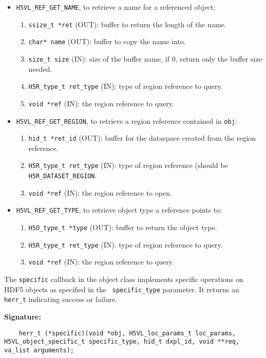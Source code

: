 \begin{itemize}
\item {\tt H5VL\_REF\_GET\_NAME}, to retrieve a name for a referenced object:
  \begin{enumerate}
  \item {\tt ssize\_t *ret} (OUT): buffer to return the length of the
    name.
  \item {\tt char* name} (OUT): buffer to copy the name into.
  \item {\tt size\_t size} (IN): size of the buffer name, if 0, return
    only the buffer size needed.
  \item {\tt H5R\_type\_t ret\_type} (IN): type of region reference to
    query.
  \item {\tt void *ref} (IN): the region reference to query.
  \end{enumerate}
  
\item {\tt H5VL\_REF\_GET\_REGION}, to retrieve a region reference
  contained in {\tt obj}:
  \begin{enumerate}
  \item {\tt hid\_t *ret\_id} (OUT): buffer for the dataspace created
    from the region reference.
  \item {\tt H5R\_type\_t ret\_type} (IN): type of region reference
    (should be {\tt H5R\_DATASET\_REGION}.
  \item {\tt void *ref} (IN): the region reference to open.
  \end{enumerate}

\item {\tt H5VL\_REF\_GET\_TYPE}, to retrieve object type a reference
  points to:
  \begin{enumerate}
  \item {\tt H5O\_type\_t *type} (OUT): buffer to return the object type.
  \item {\tt H5R\_type\_t ret\_type} (IN): type of region reference to
    query.
  \item {\tt void *ref} (IN): the region reference to query.
  \end{enumerate}
\end{itemize}

The {\tt specific} callback in the object class implements specific operations on HDF5 objects as specified in the {\tt
  specific\_type} parameter. It returns an {\tt herr\_t} indicating success or failure.

\textbf{Signature:}
\begin{lstlisting}
	herr_t (*specific)(void *obj, H5VL_loc_params_t loc_params, H5VL_object_specific_t specific_type, hid_t dxpl_id, void **req, va_list arguments);
\end{lstlisting}

